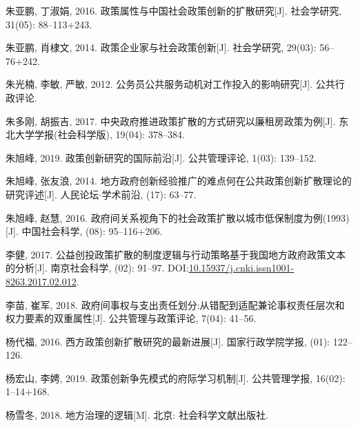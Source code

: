\documentclass[
  12pt,
]{ctexart}
\newlength{\cslhangindent}
\newlength{\cslentryspacingunit} %
\newenvironment{CSLReferences}[2] %
 {%
  \setlength{\parindent}{0pt}
  \ifodd #1
  \let\oldpar\par
  \def\par{\hangindent=\cslhangindent\oldpar}
  \fi
  \setlength{\parskip}{#2\cslentryspacingunit}
 }%
 {}
\begin{document}
\begin{CSLReferences}{1}{0}
\leavevmode{}%
朱亚鹏, 丁淑娟, 2016. {政策属性与中国社会政策创新的扩散研究}{[}J{]}. 社会学研究, 31(05): 88--113+243.

\leavevmode{}%
朱亚鹏, 肖棣文, 2014. {政策企业家与社会政策创新}{[}J{]}. 社会学研究, 29(03): 56--76+242.

\leavevmode{}%
朱光楠, 李敏, 严敏, 2012. 公务员公共服务动机对工作投入的影响研究{[}J{]}. 公共行政评论.

\leavevmode{}%
朱多刚, 胡振吉, 2017. 中央政府推进政策扩散的方式研究\textemdash\textemdash 以廉租房政策为例{[}J{]}. 东北大学学报(社会科学版), 19(04): 378--384.

\leavevmode{}%
朱旭峰, 2019. {政策创新研究的国际前沿}{[}J{]}. 公共管理评论, 1(03): 139--152.

\leavevmode{}%
朱旭峰, 张友浪, 2014. {地方政府创新经验推广的难点何在\textemdash\textemdash 公共政策创新扩散理论的研究评述}{[}J{]}. 人民论坛{\(\cdot\)}学术前沿, (17): 63--77.

\leavevmode{}%
朱旭峰, 赵慧, 2016. {政府间关系视角下的社会政策扩散\textemdash\textemdash 以城市低保制度为例(1993)}{[}J{]}. 中国社会科学, (08): 95--116+206.

\leavevmode{}%
李健, 2017. {公益创投政策扩散的制度逻辑与行动策略\textemdash\textemdash 基于我国地方政府政策文本的分析}{[}J{]}. 南京社会科学, (02): 91--97. DOI:\href{https://doi.org/10.15937/j.cnki.issn1001-8263.2017.02.012}{10.15937/j.cnki.issn1001-8263.2017.02.012}.

\leavevmode{}%
李苗, 崔军, 2018. {政府间事权与支出责任划分:从错配到适配\textemdash\textemdash 兼论事权责任层次和权力要素的双重属性}{[}J{]}. 公共管理与政策评论, 7(04): 41--56.

\leavevmode{}%
杨代福, 2016. {西方政策创新扩散研究的最新进展}{[}J{]}. 国家行政学院学报, (01): 122--126.

\leavevmode{}%
杨宏山, 李娉, 2019. {政策创新争先模式的府际学习机制}{[}J{]}. 公共管理学报, 16(02): 1--14+168.

\leavevmode{}%
杨雪冬, 2018. {地方治理的逻辑}{[}M{]}. {北京}: {社会科学文献出版社}.


\end{CSLReferences}
\end{document}
